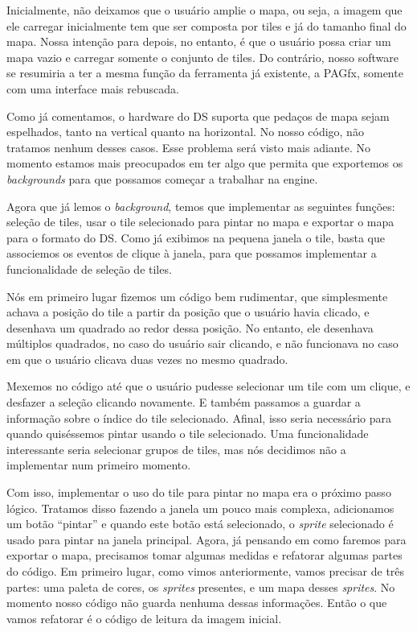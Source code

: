 Inicialmente, não deixamos que o usuário amplie o mapa, ou seja, a imagem que ele carregar inicialmente tem que ser composta por tiles e já do tamanho final do mapa. Nossa intenção para depois, no entanto, é que o usuário possa criar um mapa vazio e carregar somente o conjunto de tiles. Do contrário, nosso software se resumiria a ter a mesma função da ferramenta já existente, a PAGfx, somente com uma interface mais rebuscada.

Como já comentamos, o hardware do DS suporta que pedaços de mapa sejam espelhados, tanto na vertical quanto na horizontal. No nosso código, não tratamos nenhum desses casos. Esse problema será visto mais adiante. No momento estamos mais preocupados em ter algo que permita que exportemos os \textit{backgrounds} para que possamos começar a trabalhar na engine.

Agora que já lemos o \textit{background}, temos que implementar as seguintes funções: seleção de tiles, usar o tile selecionado para pintar no mapa e exportar o mapa para o formato do DS. Como já exibimos na pequena janela o tile, basta que associemos os eventos de clique à janela, para que possamos implementar a funcionalidade de seleção de tiles.

Nós em primeiro lugar fizemos um código bem rudimentar, que simplesmente achava a posição do tile a partir da posição que o usuário havia clicado, e desenhava um quadrado ao redor dessa posição. No entanto, ele desenhava múltiplos quadrados, no caso do usuário sair clicando, e não funcionava no caso em que o usuário clicava duas vezes no mesmo quadrado.

Mexemos no código até que o usuário pudesse selecionar um tile com um clique, e desfazer a seleção clicando novamente. E também passamos a guardar a informação sobre o índice do tile selecionado. Afinal, isso seria necessário para quando quiséssemos pintar usando o tile selecionado. Uma funcionalidade interessante seria selecionar grupos de tiles, mas nós decidimos não a implementar num primeiro momento.

Com isso, implementar o uso do tile para pintar no mapa era o próximo passo lógico. Tratamos disso fazendo a janela um pouco mais complexa, adicionamos um botão ``pintar'' e quando este botão está selecionado, o \textit{sprite} selecionado é usado para pintar na janela principal. Agora, já pensando em como faremos para exportar o mapa, precisamos tomar algumas medidas e refatorar algumas partes do código. Em primeiro lugar, como vimos anteriormente, vamos precisar de três partes: uma paleta de cores, os \textit{sprites} presentes, e um mapa desses \textit{sprites}. No momento nosso código não guarda nenhuma dessas informações. Então o que vamos refatorar é o código de leitura da imagem inicial.

